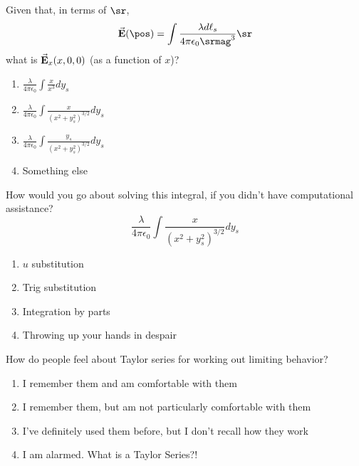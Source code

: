 \documentclass[pdf,aspectratio=169]{beamer}
\begin{document}
\begin{frame}{}
	Given that, in terms of $\sr$,
	\[\va{E}(\pos) = \int \frac{\lambda d\ell_s}{4\pi\epsilon_0 \srmag^3}\sr\]
	what is $\va{E}_x(x,0,0)$ (as a function of $x$)?
	\begin{enumerate}
		\item $\displaystyle \frac{\lambda}{4\pi\epsilon_0} \int \frac{ x}{x^3}dy_s $
		\item \alert<2>{$\displaystyle \frac{\lambda}{4\pi\epsilon_0} \int \frac{ x}{(x^2+y_s^2)^{3/2}} dy_s$}
		\item $\displaystyle \frac{\lambda}{4\pi\epsilon_0} \int \frac{ y_s}{(x^2+y_s^2)^{3/2}}dy_s$
		\item Something else
	\end{enumerate}
\end{frame}

\begin{frame}{}
	How would you go about solving this integral, if you didn't have computational assistance?
	\[\frac{\lambda}{4\pi\epsilon_0} \int \frac{ x}{(x^2+y_s^2)^{3/2}} dy_s\]
	\begin{enumerate}
		\item $u$ substitution
		\item \alert<2>{Trig substitution}
		\item Integration by parts
		\item Throwing up your hands in despair
	\end{enumerate}
\end{frame}


\begin{frame}{}
	How do people feel about Taylor series for working out limiting behavior?
	\begin{enumerate}
		\item I remember them and am comfortable with them
		\item I remember them, but am not particularly comfortable with them
		\item I've definitely used them before, but I don't recall how they work
		\item I am alarmed. What is a Taylor Series?!
	\end{enumerate}
\end{frame}
\end{document}
